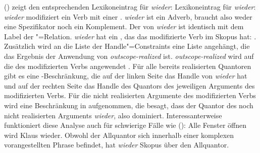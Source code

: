 () zeigt den entsprechenden Lexikoneintrag für \emph{wieder}:
\eas
\label{le-wieder}%
Lexikoneintrag für \emph{wieder}:\\
\zs
{}
\emph{wieder} modifiziert ein Verb mit einer \compsl {}. \emph{wieder} ist ein Adverb, braucht
also weder eine Spezifikator noch ein Komplement. Der \ltopw von \emph{wieder} ist identisch mit dem
Label der "=Relation. \emph{wieder} hat ein \argone, das das modifizierte Verb im
Skopus hat:  \qeq {}. Zusätzlich wird an die Liste der Handle"=Constraints eine Liste
angehängt, die das Ergebnis der Anwendung von \emph{outscope-realized} ist. \emph{outscope-realized} wird auf die
\compsl des modifizierten Verbs angewendet . Für alle bereits realisierten Quantoren gibt
es eine \qeq-Beschränkung, die auf der linken Seite das Handle von \emph{wieder}  hat und
auf der rechten Seite das Handle des Quantors des jeweiligen Arguments des modifizierten Verbs. Für
die nicht realisierten Argumente des modifizierten Verbs wird eine Beschränkung in \hcons
aufgenommen, die besagt, dass der Quantor des noch nicht realisierten Arguments \emph{wieder}, also
 dominiert.
%
%
Interessanterweise funktioniert diese Analyse auch für schwierige Fälle wie ():
\ea 
Alle Fenster öffnen wird Klaus wieder.
\z
Obwohl der Allquantor sich innerhalb einer komplexen vorangestellten Phrase befindet, hat
\emph{wieder} Skopus über den Allquantor.

